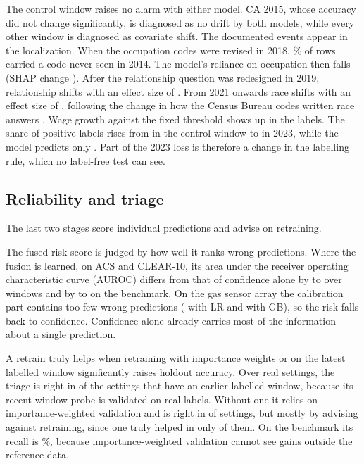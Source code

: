 \documentclass[10pt]{article}
\begin{document}
The control window raises no alarm with either model. CA 2015, whose accuracy did not change significantly, is diagnosed as no drift by both models, while every other window is diagnosed as covariate shift. The documented events appear in the localization. When the occupation codes were revised in 2018, \% of rows carried a code never seen in 2014. The model's reliance on occupation then falls (SHAP change ). After the relationship question was redesigned in 2019, relationship shifts with an effect size of . From 2021 onwards race shifts with an effect size of , following the change in how the Census Bureau codes written race answers \cite{census2021race}. Wage growth against the fixed threshold shows up in the labels. The share of positive labels rises from  in the control window to  in 2023, while the model predicts only . Part of the 2023 loss is therefore a change in the labelling rule, which no label-free test can see.

\subsection{Reliability and triage}
\label{sec:res-reliability}
The last two stages score individual predictions and advise on retraining.

The fused risk score is judged by how well it ranks wrong predictions. Where the fusion is learned, on ACS and CLEAR-10, its area under the receiver operating characteristic curve (AUROC) differs from that of confidence alone by  to  over  windows and by  to  on the benchmark. On the gas sensor array the calibration part contains too few wrong predictions ( with LR and  with GB), so the risk falls back to confidence. Confidence alone already carries most of the information about a single prediction.

A retrain truly helps when retraining with importance weights or on the latest labelled window significantly raises holdout accuracy. Over  real settings, the triage is right in  of the  settings that have an earlier labelled window, because its recent-window probe is validated on real labels. Without one it relies on importance-weighted validation and is right in  of  settings, but mostly by advising against retraining, since one truly helped in only  of them. On the benchmark its recall is \%, because importance-weighted validation cannot see gains outside the reference data.
\end{document}
